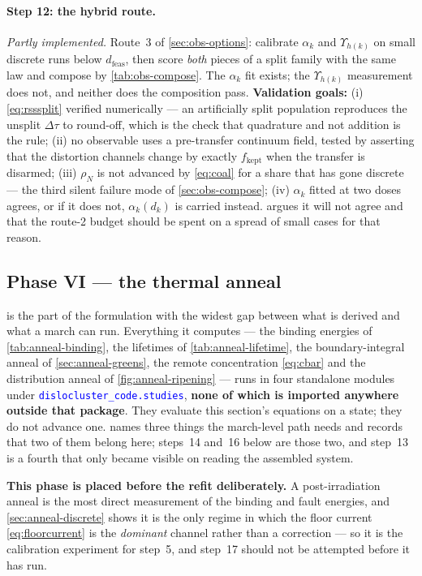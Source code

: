 \documentclass{article}
\newcommand{\textttclr}[1]{\textcolor{blue}{\texttt{#1}}}
\begin{document}
\paragraph{Step 12: the hybrid route.} \emph{Partly implemented.} Route~3 of
\cref{sec:obs-options}: calibrate $\alpha_k$ and $\Upsilon_{h(k)}$ on small
discrete runs below $d_{\mathrm{feas}}$, then score \emph{both} pieces of a split
family with the same law and compose by \cref{tab:obs-compose}. The $\alpha_k$
fit exists; the $\Upsilon_{h(k)}$ measurement does not, and neither does the
composition pass.
\textbf{Validation goals:} (i) \cref{eq:rsssplit} verified numerically --- an
artificially split population reproduces the unsplit $\Delta\tau$ to round-off,
which is the check that quadrature and not addition is the rule; (ii) no
observable uses a pre-transfer continuum field, tested by asserting that the
distortion channels change by exactly $f_{\mathrm{kept}}$ when the transfer is
disarmed; (iii) $\rho_N$ is not advanced by \cref{eq:coal} for a share that has
gone discrete --- the third silent failure mode of \cref{sec:obs-compose};
(iv) $\alpha_k$ fitted at two doses agrees, or if it does not, $\alpha_k(d_k)$ is
carried instead.  argues it will not agree and that the
route-2 budget should be spent on a spread of small cases for that reason.

\subsection{Phase VI --- the thermal anneal}
\label{sec:plan-anneal}

 is the part of the formulation with the widest gap between
what is derived and what a march can run. Everything it computes --- the binding
energies of \cref{tab:anneal-binding}, the lifetimes of
\cref{tab:anneal-lifetime}, the boundary-integral anneal of
\cref{sec:anneal-greens}, the remote concentration \cref{eq:cbar} and the
distribution anneal of \cref{fig:anneal-ripening} --- runs in four standalone
modules under \textttclr{dislocluster\_code.studies}, \textbf{none of which is
imported anywhere outside that package}. They evaluate this section's equations
on a state; they do not advance one.  names three things
the march-level path needs and records that two of them belong here; steps~14
and~16 below are those two, and step~13 is a fourth that only became visible on
reading the assembled system.

\textbf{This phase is placed before the refit deliberately.} A post-irradiation
anneal is the most direct measurement of the binding and fault energies, and
\cref{sec:anneal-discrete} shows it is the only regime in which the floor current
\cref{eq:floorcurrent} is the \emph{dominant} channel rather than a correction ---
so it is the calibration experiment for step~5, and step~17 should not be
attempted before it has run.
\end{document}
